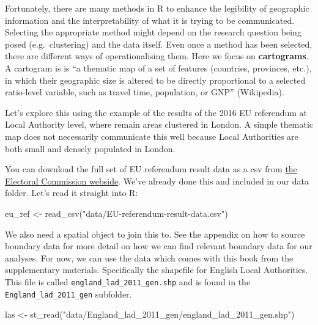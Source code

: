\documentclass[
]{book}
\newenvironment{Shaded}{\begin{snugshade}}{\end{snugshade}}
\newcommand{\FunctionTok}[1]{\textcolor[rgb]{0.00,0.00,0.00}{#1}}
\newcommand{\NormalTok}[1]{#1}
\newcommand{\OtherTok}[1]{\textcolor[rgb]{0.56,0.35,0.01}{#1}}
\newcommand{\StringTok}[1]{\textcolor[rgb]{0.31,0.60,0.02}{#1}}
\begin{document}
Fortunately, there are many methods in R to enhance the legibility of geographic information and the interpretability of what it is trying to be communicated. Selecting the appropriate method might depend on the research question being posed (e.g.~clustering) and the data itself. Even once a method has been selected, there are different ways of operationalising them. Here we focus on \textbf{cartograms}. A cartogram is is ``a thematic map of a set of features (countries, provinces, etc.), in which their geographic size is altered to be directly proportional to a selected ratio-level variable, such as travel time, population, or GNP'' (Wikipedia).

Let's explore this using the example of the results of the 2016 EU referendum at Local Authority level, where remain areas clustered in London. A simple thematic map does not necessarily communicate this well because Local Authorities are both small and densely populated in London.

You can download the full set of EU referendum result data as a csv from \href{https://www.electoralcommission.org.uk/find-information-by-subject/elections-and-referendums/past-elections-and-referendums/eu-referendum/eu-referendum-result-visualisations}{the Electoral Commission webside}. We've already done this and included in our data folder. Let's read it straight into R:

\begin{Shaded}
\begin{Highlighting}[]
\NormalTok{eu\_ref }\OtherTok{\textless{}{-}} \FunctionTok{read\_csv}\NormalTok{(}\StringTok{"data/EU{-}referendum{-}result{-}data.csv"}\NormalTok{)}
\end{Highlighting}
\end{Shaded}

We also need a spatial object to join this to. See the appendix on how to source boundary data for more detail on how we can find relevant boundary data for our analyses. For now, we can use the data which comes with this book from the supplementary materials. Specifically the shapefile for English Local Authorities. This file is called \texttt{england\_lad\_2011\_gen.shp} and is found in the \texttt{England\_lad\_2011\_gen} subfolder.

\begin{Shaded}
\begin{Highlighting}[]
\NormalTok{las }\OtherTok{\textless{}{-}} \FunctionTok{st\_read}\NormalTok{(}\StringTok{"data/England\_lad\_2011\_gen/england\_lad\_2011\_gen.shp"}\NormalTok{)}
\end{Highlighting}
\end{Shaded}
\end{document}
